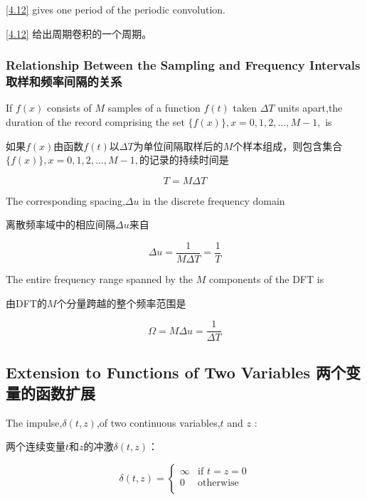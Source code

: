 \documentclass[12pt]{article}
\numberwithin{equation}{section}%
\begin{document}
\ref{4.12} gives one period of the periodic convolution.

\ref{4.12} 给出周期卷积的一个周期。

\subsubsection{Relationship Between the Sampling and Frequency Intervals 取样和频率间隔的关系}

If $f(x)$ consists of $M$ samples of a function $f(t)$ taken $ \Delta  T$ units apart,the duration of the record comprising the set  $\{f(x)\},x=0,1,2,\ldots ,M-1, $ is 

如果$f(x)$由函数$f(t)$以$ \Delta  T$为单位间隔取样后的$M$个样本组成，则包含集合$\{f(x)\},x=0,1,2,\ldots ,M-1, $的记录的持续时间是

\begin{equation} \label{4.13}
T=M\Delta T
\end{equation}


The corresponding spacing,$\Delta u$ in the discrete frequency domain

离散频率域中的相应间隔$\Delta u$来自

\begin{equation} \label{4.14}
\Delta u=\frac{1}{M\Delta T}=\frac{1}{T}
\end{equation}
 
The entire frequency range spanned by the $M$ components of the DFT is

由DFT的$M$个分量跨越的整个频率范围是

\begin{equation} \label{4.15}
\Omega =M\Delta u=\frac{1}{\Delta T}
\end{equation}

\subsection{Extension to Functions of Two Variables 两个变量的函数扩展}

The impulse,$\delta(t,z)$,of two continuous variables,$t$ and $z$ :

两个连续变量$t$和$z$的冲激$\delta(t,z)$：

\begin{equation} \label{4.16}
\delta(t,z) = \left\{ \begin{array}{ll}
\infty & \textrm{if $t=z=0$}\\
0 & \textrm{otherwise}\\
\end{array} \right.
\end{equation}
\end{document}
